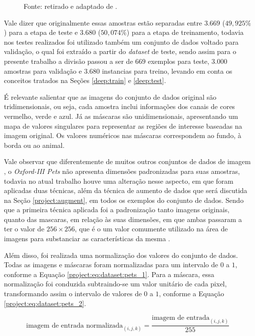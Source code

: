 \begin{figure}[H]
    Fonte: retirado e adaptado de \cite{Parkhi2012CatsDogs}.
\end{figure}

Vale dizer que originalmente essas amostras estão separadas entre $3.669$ ($49,925\%$) para a etapa de teste e $3.680$ ($50,074\%$) para a etapa de treinamento, todavia nos testes realizados foi utilizado também um conjunto de dados voltado para validação, o qual foi extraído a partir do \textit{dataset} de teste, sendo assim para o presente trabalho a divisão passou a ser de $669$ exemplos para teste, 3.000 amostras para validação e 3.680 instancias para treino, levando em conta os conceitos tratados na Seções \ref{deep:train} e \ref{deep:test}.

É relevante salientar que as imagens do conjunto de dados original são tridimensionais, ou seja, cada amostra inclui informações dos canais de cores vermelho, verde e azul. Já as máscaras são unidimensionais, apresentando um mapa de valores singulares para representar as regiões de interesse baseadas na imagem original. Os valores numéricos nas máscaras correspondem ao fundo, à borda ou ao animal.

Vale observar que diferentemente de muitos outros conjuntos de dados de imagem \citep{Bossard2014Food-101Forests}, o \textit{Oxford-III Pets} não apresenta dimensões padronizadas para suas amostras, todavia no atual trabalho houve uma alteração nesse aspecto, em que foram aplicadas duas técnicas, além da técnica de aumento de dados que será discutida na Seção \ref{project:augment}, em todos os exemplos do conjunto de dados. Sendo que a primeira técnica aplicada foi a padronização tanto imagens originais, quanto das mascaras, em relação às suas dimensões, em que ambas passaram a ter o valor de $256 \times 256$, que é o um valor comumente utilizado na área de imagens para substanciar as características da mesma \citep{Lee1983DigitalFilter}.

Além disso, foi realizada uma normalização dos valores do conjunto de dados. Todas as imagens e máscaras foram normalizadas para um intervalo de $0$ a $1$, conforme a Equação \ref{project:eq:dataset:pets_1}. Para a máscara, essa normalização foi conduzida subtraindo-se um valor unitário de cada pixel, transformando assim o intervalo de valores de $0$ a $1$, conforme a Equação \ref{project:eq:dataset:pets_2}.

\begin{equation}
    \label{project:eq:dataset:pets_1}
    \text{imagem de entrada normalizada}_{(i,j,k)} = \frac{\text{imagem de entrada}_{(i,j,k)}}{255}
\end{equation}

